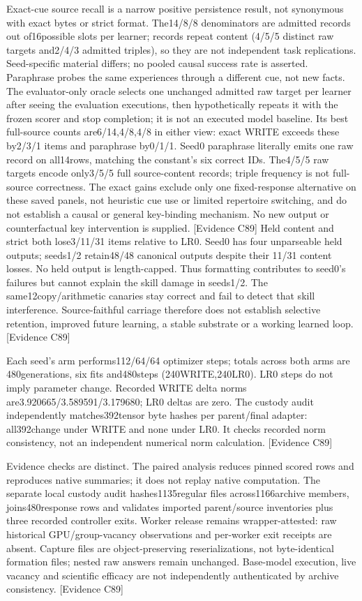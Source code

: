\documentclass{article}
\begin{document}
Exact-cue source recall is a narrow positive persistence result, not synonymous
with exact bytes or strict format. The14/8/8 denominators are admitted records
out of16possible slots per learner; records repeat content (4/5/5 distinct raw
targets and2/4/3 admitted triples), so they are not independent task replications.
Seed-specific material differs; no pooled causal success rate is asserted.
Paraphrase probes the same experiences through a different cue, not new facts.
The evaluator-only oracle selects one unchanged admitted raw target per learner
after seeing the evaluation executions, then hypothetically repeats it with the
frozen scorer and stop completion; it is not an executed model baseline. Its best
full-source counts are6/14,4/8,4/8 in either view: exact WRITE exceeds these
by2/3/1 items and paraphrase by0/1/1. Seed0 paraphrase literally emits one raw
record on all14rows, matching the constant's six correct IDs. The4/5/5 raw
targets encode only3/5/5 full source-content records; triple frequency is not
full-source correctness. The exact gains exclude only one fixed-response
alternative on these saved panels, not heuristic cue use or limited repertoire
switching, and do not establish a causal or general key-binding mechanism.
No new output or counterfactual key intervention is supplied. \textsf{[Evidence C89]}
Held content and strict both lose3/11/31 items relative to LR0. Seed0 has four
unparseable held outputs; seeds1/2 retain48/48 canonical outputs despite their
11/31 content losses. No held output is length-capped. Thus formatting contributes
to seed0's failures but cannot explain the skill damage in seeds1/2.
The same12copy/arithmetic canaries stay correct and fail to detect that skill
interference. Source-faithful carriage therefore does not establish selective
retention, improved future learning, a stable substrate or a working learned loop.
\textsf{[Evidence C89]}

Each seed's arm performs112/64/64 optimizer steps; totals across both arms are
480generations, six fits and480steps (240WRITE,240LR0). LR0 steps do not imply
parameter change. Recorded WRITE delta norms are3.920665/3.589591/3.179680;
LR0 deltas are zero. The custody audit independently matches392tensor byte hashes
per parent/final adapter: all392change under WRITE and none under LR0. It checks
recorded norm consistency, not an independent numerical norm calculation.
\textsf{[Evidence C89]}

Evidence checks are distinct. The paired analysis reduces pinned scored rows
and reproduces native summaries; it does not replay native computation. The
separate local custody audit hashes1135regular files across1166archive members,
joins480response rows and validates imported parent/source inventories plus
three recorded controller exits. Worker release remains wrapper-attested:
raw historical GPU/group-vacancy observations and per-worker exit receipts are
absent. Capture files are object-preserving reserializations, not byte-identical
formation files; nested raw answers remain unchanged. Base-model execution,
live vacancy and scientific efficacy are not independently authenticated by
archive consistency. \textsf{[Evidence C89]}
\end{document}
